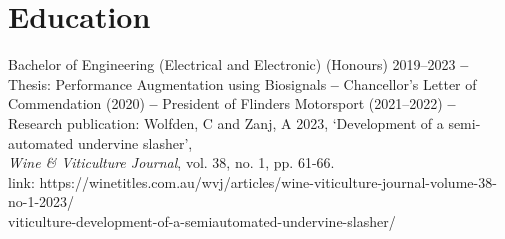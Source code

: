 \section{Education}
{Bachelor of Engineering (Electrical and Electronic) (Honours)}
{2019--2023}
{\textbf{--} Thesis: Performance Augmentation using Biosignals}
{\textbf{--} Chancellor's Letter of Commendation (2020)}
{\textbf{--} President of Flinders Motorsport (2021--2022)}
{\textbf{--} Research publication:}
{Wolfden, C and Zanj, A 2023, `Development of a semi-automated undervine slasher', \\
    \textit{Wine \& Viticulture Journal}, vol. 38, no. 1, pp. 61-66. \\
    link: https://winetitles.com.au/wvj/articles/wine-viticulture-journal-volume-38-no-1-2023/ \\
    viticulture-development-of-a-semiautomated-undervine-slasher/
}

